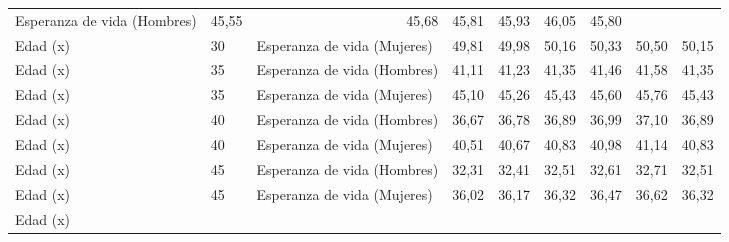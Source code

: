 \begin{tabular}{lllllllll}
  \multicolumn{1}{l}{Esperanza de vida (Hombres)} &
  \multicolumn{1}{|r}{45,55} &
  \multicolumn{1}{r}{45,68} &
  \multicolumn{1}{r}{45,81} &
  \multicolumn{1}{r}{45,93} &
  \multicolumn{1}{r}{46,05} &
  \multicolumn{1}{r}{45,80} \\
\multicolumn{1}{l}{Edad (x)} &
  \multicolumn{1}{l}{30} &
  \multicolumn{1}{l}{Esperanza de vida (Mujeres)} &
  \multicolumn{1}{|r}{49,81} &
  \multicolumn{1}{r}{49,98} &
  \multicolumn{1}{r}{50,16} &
  \multicolumn{1}{r}{50,33} &
  \multicolumn{1}{r}{50,50} &
  \multicolumn{1}{r}{50,15} \\
\multicolumn{1}{l}{Edad (x)} &
  \multicolumn{1}{l}{35} &
  \multicolumn{1}{l}{Esperanza de vida (Hombres)} &
  \multicolumn{1}{|r}{41,11} &
  \multicolumn{1}{r}{41,23} &
  \multicolumn{1}{r}{41,35} &
  \multicolumn{1}{r}{41,46} &
  \multicolumn{1}{r}{41,58} &
  \multicolumn{1}{r}{41,35} \\
\multicolumn{1}{l}{Edad (x)} &
  \multicolumn{1}{l}{35} &
  \multicolumn{1}{l}{Esperanza de vida (Mujeres)} &
  \multicolumn{1}{|r}{45,10} &
  \multicolumn{1}{r}{45,26} &
  \multicolumn{1}{r}{45,43} &
  \multicolumn{1}{r}{45,60} &
  \multicolumn{1}{r}{45,76} &
  \multicolumn{1}{r}{45,43} \\
\multicolumn{1}{l}{Edad (x)} &
  \multicolumn{1}{l}{40} &
  \multicolumn{1}{l}{Esperanza de vida (Hombres)} &
  \multicolumn{1}{|r}{36,67} &
  \multicolumn{1}{r}{36,78} &
  \multicolumn{1}{r}{36,89} &
  \multicolumn{1}{r}{36,99} &
  \multicolumn{1}{r}{37,10} &
  \multicolumn{1}{r}{36,89} \\
\multicolumn{1}{l}{Edad (x)} &
  \multicolumn{1}{l}{40} &
  \multicolumn{1}{l}{Esperanza de vida (Mujeres)} &
  \multicolumn{1}{|r}{40,51} &
  \multicolumn{1}{r}{40,67} &
  \multicolumn{1}{r}{40,83} &
  \multicolumn{1}{r}{40,98} &
  \multicolumn{1}{r}{41,14} &
  \multicolumn{1}{r}{40,83} \\
\multicolumn{1}{l}{Edad (x)} &
  \multicolumn{1}{l}{45} &
  \multicolumn{1}{l}{Esperanza de vida (Hombres)} &
  \multicolumn{1}{|r}{32,31} &
  \multicolumn{1}{r}{32,41} &
  \multicolumn{1}{r}{32,51} &
  \multicolumn{1}{r}{32,61} &
  \multicolumn{1}{r}{32,71} &
  \multicolumn{1}{r}{32,51} \\
\multicolumn{1}{l}{Edad (x)} &
  \multicolumn{1}{l}{45} &
  \multicolumn{1}{l}{Esperanza de vida (Mujeres)} &
  \multicolumn{1}{|r}{36,02} &
  \multicolumn{1}{r}{36,17} &
  \multicolumn{1}{r}{36,32} &
  \multicolumn{1}{r}{36,47} &
  \multicolumn{1}{r}{36,62} &
  \multicolumn{1}{r}{36,32} \\
\multicolumn{1}{l}{Edad (x)} &

\end{tabular}
